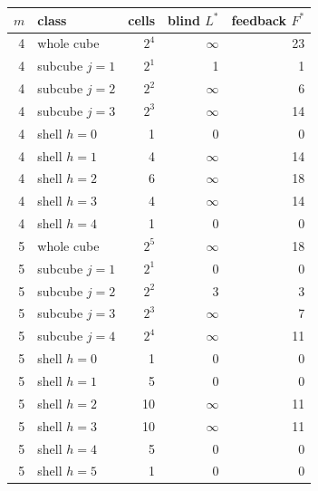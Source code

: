 \begin{tabular}{rlrrr}
\toprule
$m$ & class & cells & blind $L^\ast$ & feedback $F^\ast$\\
\midrule
4 & whole cube & $2^4$ & $\infty$ & 23\\
4 & subcube $j=1$ & $2^1$ & 1 & 1\\
4 & subcube $j=2$ & $2^2$ & $\infty$ & 6\\
4 & subcube $j=3$ & $2^3$ & $\infty$ & 14\\
4 & shell $h=0$ & 1 & 0 & 0\\
4 & shell $h=1$ & 4 & $\infty$ & 14\\
4 & shell $h=2$ & 6 & $\infty$ & 18\\
4 & shell $h=3$ & 4 & $\infty$ & 14\\
4 & shell $h=4$ & 1 & 0 & 0\\
5 & whole cube & $2^5$ & $\infty$ & 18\\
5 & subcube $j=1$ & $2^1$ & 0 & 0\\
5 & subcube $j=2$ & $2^2$ & 3 & 3\\
5 & subcube $j=3$ & $2^3$ & $\infty$ & 7\\
5 & subcube $j=4$ & $2^4$ & $\infty$ & 11\\
5 & shell $h=0$ & 1 & 0 & 0\\
5 & shell $h=1$ & 5 & 0 & 0\\
5 & shell $h=2$ & 10 & $\infty$ & 11\\
5 & shell $h=3$ & 10 & $\infty$ & 11\\
5 & shell $h=4$ & 5 & 0 & 0\\
5 & shell $h=5$ & 1 & 0 & 0\\
\bottomrule
\end{tabular}
